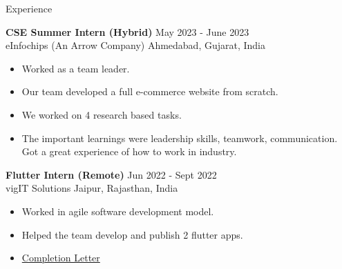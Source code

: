 \documentclass{resume}
\begin{document}
\begin{rSection}{Experience}
\vspace{-1em}
    \item \textbf{CSE Summer Intern (Hybrid)}
    \hfill May 2023 - June 2023
    \\ eInfochips (An Arrow Company)
    \hfill Ahmedabad, Gujarat, India
    \begin{itemize}
        \setlength\itemsep{-0.5em}
        \item Worked as a team leader.
        \item Our team developed a full e-commerce website from scratch.
        \item We worked on 4 research based tasks.
        \item The important learnings were leadership skills, teamwork, communication.
        \\ Got a great experience of how to work in industry.
    \end{itemize}
    
    \item \textbf{Flutter Intern (Remote)}
    \hfill Jun 2022 - Sept 2022
    \\ vigIT Solutions
    \hfill Jaipur, Rajasthan, India
    \begin{itemize}
        \setlength\itemsep{-0.5em}
        \item Worked in agile software development model.
        \item Helped the team develop and publish 2 flutter apps.
        \item \href{https://drive.google.com/file/d/1yF5baJ-uIWpwAHL0Sd-CwycYHjbyFumW/view?usp=sharing}{Completion Letter}
    \end{itemize}
\end{rSection}
\end{document}
